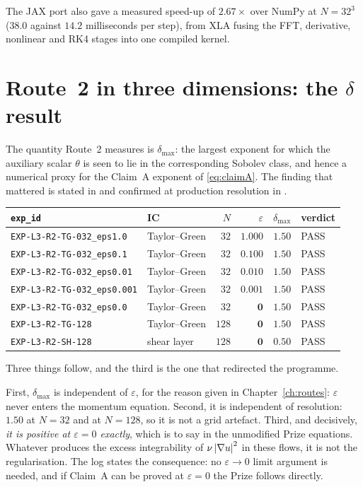 The JAX port also gave a measured speed-up of \(2.67\times\) over NumPy at
\(N=32^3\) (\(38.0\) against \(14.2\) milliseconds per step), from XLA fusing
the FFT, derivative, nonlinear and RK4 stages into one compiled kernel.

\section{Route~2 in three dimensions: the \texorpdfstring{\(\delta\)}{delta} result}
\label{sec:route2-3d}

The quantity Route~2 measures is \(\delta_{\max}\): the largest exponent for
which the auxiliary scalar \(\theta\) is seen to lie in the corresponding
Sobolev class, and hence a numerical proxy for the Claim~A exponent of
\eqref{eq:claimA}. The finding that mattered is stated in  and
confirmed at production resolution in .

\begin{center}
\small
\begin{tabular}{@{}l l r r r l@{}}
\toprule
\texttt{exp\_id} & IC & \(N\) & \(\varepsilon\) & \(\delta_{\max}\) & verdict \\
\midrule
\texttt{EXP-L3-R2-TG-032\_eps1.0}   & Taylor--Green & \(32\) & \(1.000\) & \(1.50\) & \textsf{PASS} \\
\texttt{EXP-L3-R2-TG-032\_eps0.1}   & Taylor--Green & \(32\) & \(0.100\) & \(1.50\) & \textsf{PASS} \\
\texttt{EXP-L3-R2-TG-032\_eps0.01}  & Taylor--Green & \(32\) & \(0.010\) & \(1.50\) & \textsf{PASS} \\
\texttt{EXP-L3-R2-TG-032\_eps0.001} & Taylor--Green & \(32\) & \(0.001\) & \(1.50\) & \textsf{PASS} \\
\texttt{EXP-L3-R2-TG-032\_eps0.0}   & Taylor--Green & \(32\) & \(\mathbf{0}\) & \(\mathbf{1.50}\) & \textsf{PASS} \\
\texttt{EXP-L3-R2-TG-128}           & Taylor--Green & \(128\) & \(\mathbf{0}\) & \(\mathbf{1.50}\) & \textsf{PASS} \\
\texttt{EXP-L3-R2-SH-128}           & shear layer & \(128\) & \(\mathbf{0}\) & \(\mathbf{0.50}\) & \textsf{PASS} \\
\bottomrule
\end{tabular}
\end{center}

\medskip
Three things follow, and the third is the one that redirected the programme.

First, \(\delta_{\max}\) is independent of \(\varepsilon\), for the reason
given in Chapter~\ref{ch:routes}: \(\varepsilon\) never enters the momentum
equation. Second, it is independent of resolution: \(1.50\) at \(N=32\) and at
\(N=128\), so it is not a grid artefact. Third, and decisively, \emph{it is
positive at \(\varepsilon=0\) exactly}, which is to say in the unmodified
Prize equations. Whatever produces the excess integrability of
\(\nu\left|\nabla u\right|^2\) in these flows, it is not the regularisation. The
 log states the consequence: no \(\varepsilon\to0\) limit argument is
needed, and if Claim~A can be proved at \(\varepsilon=0\) the Prize follows
directly.

